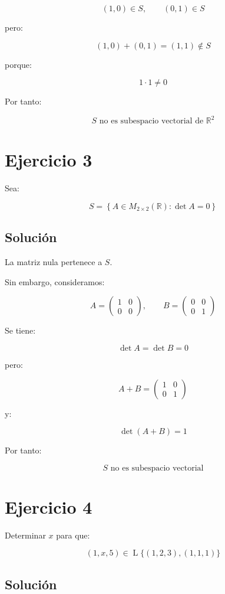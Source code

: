 \documentclass[11pt,a4paper]{article}
\newcommand{\R}{\mathbb{R}}
\newcommand{\Span}{\operatorname{L}}
\begin{document}
	\[
	(1,0)\in S,
	\qquad
	(0,1)\in S
	\]

	pero:

	\[
	(1,0)+(0,1)
	=
	(1,1)
	\notin S
	\]

	porque:

	\[
	1\cdot1\neq0
	\]

	Por tanto:

	\[
	\boxed{
	S\text{ no es subespacio vectorial de }\R^2
	}
	\]

\section{Ejercicio 3}
	Sea:

	\[
	S=
	\left\{
	A\in M_{2\times2}(\R):
	\det A=0
	\right\}
	\]

	\subsection{Solución}

	La matriz nula pertenece a $S$.

	Sin embargo, consideramos:

	\[
	A=
	\begin{pmatrix}
	1&0\\
	0&0
	\end{pmatrix},
	\qquad
	B=
	\begin{pmatrix}
	0&0\\
	0&1
	\end{pmatrix}
	\]

	Se tiene:

	\[
	\det A=\det B=0
	\]

	pero:

	\[
	A+B=
	\begin{pmatrix}
	1&0\\
	0&1
	\end{pmatrix}
	\]

	y:

	\[
	\det(A+B)=1
	\]

	Por tanto:

	\[
	\boxed{
	S\text{ no es subespacio vectorial}
	}
	\]

\section{Ejercicio 4}
	Determinar $x$ para que:

	\[
	(1,x,5)
	\in
	\Span\{(1,2,3),(1,1,1)\}
	\]

	\subsection{Solución}
\end{document}
